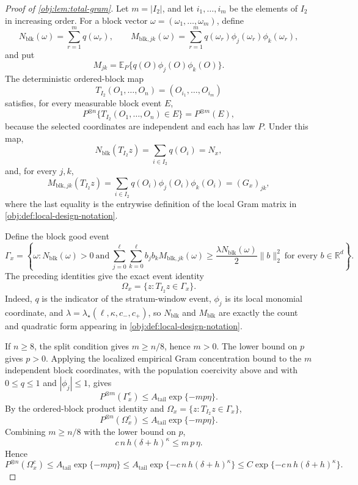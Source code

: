 \begin{proof}[Proof of \cref{obj:lem:total-gram}]
Let \(m=|I_2|\), and let \(i_1,\ldots,i_m\) be the elements of \(I_2\) in increasing order.  For a block vector \(\omega=(\omega_1,\ldots,\omega_m)\), define
\[
N_{\mathrm{blk}}(\omega)=\sum_{r=1}^m q(\omega_r),\qquad
M_{\mathrm{blk},jk}(\omega)=\sum_{r=1}^m q(\omega_r)\phi_j(\omega_r)\phi_k(\omega_r),
\]
and put
\[
M_{jk}=\mathbb E_P\{q(O)\phi_j(O)\phi_k(O)\}.
\]
The deterministic ordered-block map
\[
T_{I_2}(O_1,\ldots,O_n)=(O_{i_1},\ldots,O_{i_m})
\]
satisfies, for every measurable block event \(E\),
\[
P^{\otimes n}\{T_{I_2}(O_1,\ldots,O_n)\in E\}=P^{\otimes m}(E),
\]
because the selected coordinates are independent and each has law \(P\).  Under this map,
\[
N_{\mathrm{blk}}(T_{I_2}z)
=
\sum_{i\in I_2}q(O_i)=N_x,
\]
and, for every \(j,k\),
\[
M_{\mathrm{blk},jk}(T_{I_2}z)
=
\sum_{i\in I_2}q(O_i)\phi_j(O_i)\phi_k(O_i)
=(G_x)_{jk},
\]
where the last equality is the entrywise definition of the local Gram matrix in \cref{obj:def:local-design-notation}.

Define the block good event
\[
\Gamma_x=
\left\{
\omega:
N_{\mathrm{blk}}(\omega)>0
\ \text{and}\ 
\sum_{j=0}^{\ell}\sum_{k=0}^{\ell}
 b_jb_k M_{\mathrm{blk},jk}(\omega)
\ge
\frac{\lambda N_{\mathrm{blk}}(\omega)}{2}\|b\|_2^2
\ \text{for every } b\in\mathbb R^d
\right\}.
\]
The preceding identities give the exact event identity
\[
\Omega_x=\{z:T_{I_2}z\in\Gamma_x\}.
\]
Indeed, \(q\) is the indicator of the stratum-window event, \(\phi_j\) is its local monomial coordinate, and \(\lambda=\lambda_\star(\ell,\kappa,c_-,c_+)\), so \(N_{\mathrm{blk}}\) and \(M_{\mathrm{blk}}\) are exactly the count and quadratic form appearing in \cref{obj:def:local-design-notation}. %

If \(n\ge8\), the split condition gives \(m\ge n/8\), hence \(m>0\).  The lower bound on \(p\) gives \(p>0\).  Applying the localized empirical Gram concentration bound to the \(m\) independent block coordinates, with the population coercivity above and with \(0\le q\le1\) and \(|\phi_j|\le1\), gives
\[
P^{\otimes m}(\Gamma_x^c)
\le
A_{\mathrm{tail}}\exp\{-mp\eta\}.
\]
By the ordered-block product identity and \(\Omega_x=\{z:T_{I_2}z\in\Gamma_x\}\),
\[
P^{\otimes n}(\Omega_x^c)
\le
A_{\mathrm{tail}}\exp\{-mp\eta\}.
\]
Combining \(m\ge n/8\) with the lower bound on \(p\),
\[
c\,n\,h(\delta+h)^\kappa
\le
m\,p\,\eta .
\]
Hence
\[
P^{\otimes n}(\Omega_x^c)
\le
A_{\mathrm{tail}}\exp\{-mp\eta\}
\le
A_{\mathrm{tail}}\exp\{-c\,n\,h(\delta+h)^\kappa\}
\le
C\exp\{-c\,n\,h(\delta+h)^\kappa\}.
\]


\end{proof}
